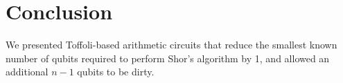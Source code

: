\documentclass[twocolumn]{article}
\begin{document}
\section{Conclusion} \label{sec:conclusion}

We presented Toffoli-based arithmetic circuits that reduce the smallest known number of qubits required to perform Shor's algorithm by 1, and allowed an additional $n-1$ qubits to be dirty.



\end{document}
